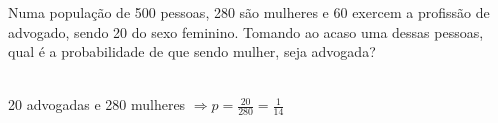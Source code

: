 \begin{ex}
Numa população de 500 pessoas, 280 são mulheres e 60 exercem a profissão de advogado, sendo 20 do sexo feminino. Tomando ao acaso uma dessas pessoas, qual é a probabilidade de que sendo mulher, seja advogada?
  \begin{sol}
    \phantom{A}\\
    20 advogadas e 280 mulheres $\Longrightarrow p=\frac{20}{280}=\frac{1}{14}$
  \end{sol}
\end{ex}